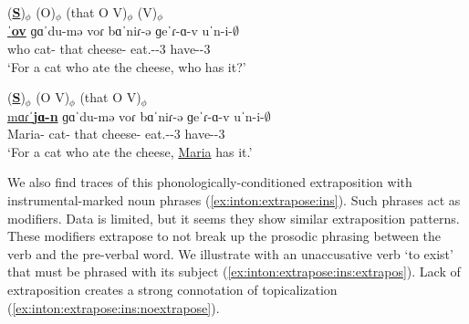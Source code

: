 \begin{exe}
	\ex \label{example:inton:other:rel:extrapos:whMore} 
	\begin{xlist}
		
		\ex \glll (\underline{\textbf{S}})$_\phi$ ({{{O}}})$_\phi$  (that {{O}} V)$_\phi$  (V)$_\phi$\\
		\underline{ˈ\textbf{ov}} {{ɡɑˈ{du}-mə}} voɾ {{bɑˈ{ni}ɾ-ə}} {ɡeˈɾ-ɑ-v}  {uˈ{n-i-$\emptyset$}}   
		\\
		who	cat-{\indf} that cheese-{} eat.{\aorperf}-{\pst}-3{\sg}   have-{\thgloss}-3{\sg}  
		\\
		\trans `For a cat who ate the cheese, who has it?'
		\\
		
		\ex \glll (\underline{\textbf{S}})$_\phi$ ({{{O}}} V)$_\phi$  (that {{O}} V)$_\phi$ \\
		\underline{mɑɾˈ\textbf{jɑ-n}} {{ɡɑˈ{du}-mə}}    voɾ {{bɑˈ{ni}ɾ-ə}} {ɡeˈɾ-ɑ-v}   {uˈ{n-i-$\emptyset$}}
		\\
		Maria-{} 	cat-{\indf}   that cheese-{} eat.{\aorperf}-{\pst}-3{\sg}   have-{\thgloss}-3{\sg} 
		\\
		\trans `For a cat who ate the cheese, \underline{Maria} has it.'
		\\
	\end{xlist}
\end{exe}


We also find traces of this phonologically-conditioned extraposition with instrumental-marked noun phrases (\ref{ex:inton:extrapose:ins}). Such phrases act as modifiers. Data is limited, but it seems they show similar extraposition patterns. These modifiers extrapose to not break up the prosodic phrasing between the verb and the pre-verbal word. We illustrate with an unaccusative verb `to exist' that must   be phrased with its subject (\ref{ex:inton:extrapose:ins:extrapos}).  Lack of extraposition creates a strong connotation of  topicalization (\ref{ex:inton:extrapose:ins:noextrapose}). 

